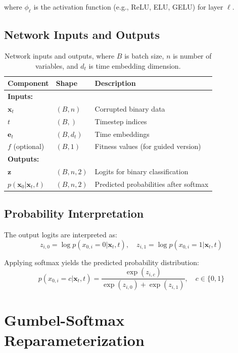 \documentclass[11pt,a4paper]{article}
\newcommand{\vx}{\mathbf{x}}
\begin{document}
where $\phi_\ell$ is the activation function (e.g., ReLU, ELU, GELU) for layer $\ell$.

\subsection{Network Inputs and Outputs}

\begin{table}[h]
\centering
\begin{tabular}{@{}lll@{}}
\toprule
\textbf{Component} & \textbf{Shape} & \textbf{Description} \\
\midrule
\textbf{Inputs:} & & \\
$\vx_t$ & $(B, n)$ & Corrupted binary data \\
$t$ & $(B,)$ & Timestep indices \\
$\mathbf{e}_t$ & $(B, d_t)$ & Time embeddings \\
$f$ (optional) & $(B, 1)$ & Fitness values (for guided version) \\
\midrule
\textbf{Outputs:} & & \\
$\mathbf{z}$ & $(B, n, 2)$ & Logits for binary classification \\
$p(\vx_0 | \vx_t, t)$ & $(B, n, 2)$ & Predicted probabilities after softmax \\
\bottomrule
\end{tabular}
\caption{Network inputs and outputs, where $B$ is batch size, $n$ is number of variables, and $d_t$ is time embedding dimension.}
\label{tab:io}
\end{table}

\subsection{Probability Interpretation}

The output logits are interpreted as:
\begin{equation}
    z_{i,0} = \log p(x_{0,i} = 0 | \vx_t, t), \quad z_{i,1} = \log p(x_{0,i} = 1 | \vx_t, t)
\end{equation}

Applying softmax yields the predicted probability distribution:
\begin{equation}
    p(x_{0,i} = c | \vx_t, t) = \frac{\exp(z_{i,c})}{\exp(z_{i,0}) + \exp(z_{i,1})}, \quad c \in \{0, 1\}
\end{equation}

\section{Gumbel-Softmax Reparameterization}
\end{document}
